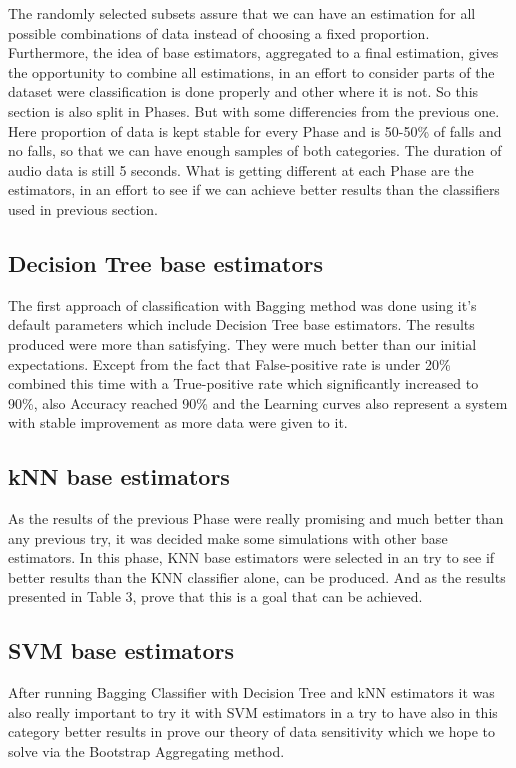 \documentclass{article}
\begin{document}
The randomly selected subsets assure that we can have an estimation for all possible combinations of data instead of choosing a fixed proportion. Furthermore, the idea of base estimators, aggregated to a final estimation, gives the opportunity to combine all estimations, in an effort to consider parts of the dataset were classification is done properly and other where it is not. 
So this section is also split in Phases. But with some differencies from the previous one. Here proportion of data is kept stable for every Phase and is 50-50\% of falls and no falls, so that we can have enough samples of both categories. The duration of audio data is still 5 seconds. 
What is getting different at each Phase are the estimators, in an effort to see if we can achieve better results than the classifiers used in previous section. 

\subsection{Decision Tree base estimators}

The first approach of classification with Bagging method was done using it's default parameters which include Decision Tree base estimators. The results produced were more than satisfying. They were much better than our initial expectations. Except from the fact that False-positive rate is under 20\% combined this time with a True-positive rate which significantly increased to 90\%, also Accuracy reached 90\% and the Learning curves also represent a system with stable improvement as more data were given to it. 

\subsection{kNN base estimators} 

As the results of the previous Phase were really promising and much better than any previous try, it was decided make some simulations with other base estimators. In this phase, KNN base estimators were selected in an try to see if better results than the KNN classifier alone, can be produced. And as the results presented in Table 3, prove that this is a goal that can be achieved.  

\subsection{SVM base estimators}

After running Bagging Classifier with Decision Tree and kNN estimators it was also really important to try it with SVM estimators in a try to have also in this category better results in prove our theory of data sensitivity which we hope to solve via the Bootstrap Aggregating method. 
\end{document}
